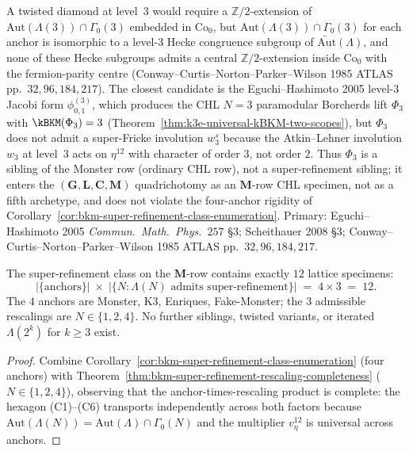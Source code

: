 \begin{remark}
\label{rem:bkm-no-twisted-lambda3}
A twisted diamond at level~$3$ would require a
$\mathbb{Z}/2$-extension of $\mathrm{Aut}(\Lambda(3))\cap\Gamma_0(3)$
embedded in $\mathrm{Co}_0$, but
$\mathrm{Aut}(\Lambda(3))\cap\Gamma_0(3)$ for each anchor is
isomorphic to a level-$3$ Hecke congruence subgroup of
$\widetilde{\mathrm{Aut}}(\Lambda)$, and none of these Hecke
subgroups admits a central $\mathbb{Z}/2$-extension inside
$\mathrm{Co}_0$ with the fermion-parity centre
(Conway--Curtis--Norton--Parker--Wilson 1985
ATLAS pp.~$32, 96, 184, 217$). The closest candidate is the
Eguchi--Hashimoto 2005 level-$3$ Jacobi form $\phi_{0,1}^{(3)}$,
which produces the CHL $N=3$ paramodular Borcherds lift $\Phi_3$
with $\kBKM(\Phi_3) = 3$
(Theorem~\ref{thm:k3e-universal-kBKM-two-scopes}), but $\Phi_3$
does not admit a super-Fricke involution $w_3^s$ because the
Atkin--Lehner involution $w_3$ at level~$3$ acts on $\eta^{12}$
with character of order $3$, not order $2$.
Thus $\Phi_3$ is a sibling of the Monster row (ordinary CHL row),
not a super-refinement sibling; it enters the
$(\mathbf{G},\mathbf{L},\mathbf{C},\mathbf{M})$ quadrichotomy as
an $\mathbf{M}$-row CHL specimen, not as a fifth archetype, and
does not violate the four-anchor rigidity of
Corollary~\ref{cor:bkm-super-refinement-class-enumeration}.
Primary: Eguchi--Hashimoto 2005
\emph{Commun.~Math.~Phys.}~$257$ \S$3$; Scheithauer 2008 \S$3$;
Conway--Curtis--Norton--Parker--Wilson 1985
ATLAS pp.~$32, 96, 184, 217$.
\end{remark}

\begin{corollary}[Total count of super-refinement specimens:
\texorpdfstring{$12 = 4\times 3$}{12 = 4x 3}]
\label{cor:bkm-super-refinement-total-count}
The super-refinement class on the $\mathbf{M}$-row contains
exactly $12$ lattice specimens:
\[
 \bigl|\{\mathrm{anchors}\}\bigr|
 \;\times\;
 \bigl|\{N : \Lambda(N)\text{ admits super-refinement}\}\bigr|
 \;=\;
 4 \times 3 \;=\; 12.
\]
The $4$ anchors are Monster, K3, Enriques, Fake-Monster; the $3$
admissible rescalings are $N\in\{1,2,4\}$. No further siblings,
twisted variants, or iterated $\Lambda(2^k)$ for $k\ge 3$ exist.
\end{corollary}

\begin{proof}[Proof]
Combine Corollary~\ref{cor:bkm-super-refinement-class-enumeration}
(four anchors) with
Theorem~\ref{thm:bkm-super-refinement-rescaling-completeness}
($N\in\{1,2,4\}$), observing that the
anchor-times-rescaling product is complete: the hexagon
(C1)--(C6) transports independently across both factors because
$\mathrm{Aut}(\Lambda(N)) =
\mathrm{Aut}(\Lambda)\cap\Gamma_0(N)$ and the multiplier
$v_\eta^{12}$ is universal across anchors.
\end{proof}

